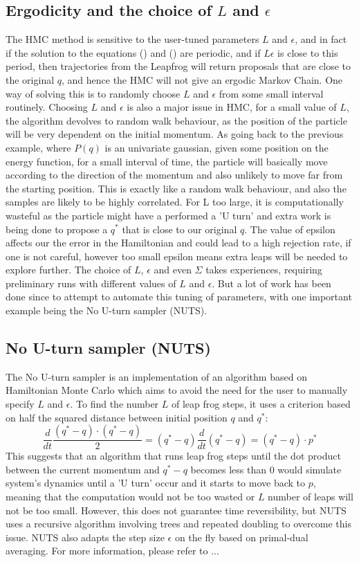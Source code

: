 \documentclass[11pt]{article}
\begin{document}
\subsection{Ergodicity and the choice of $L$ and $\epsilon$}
The HMC method is sensitive to the user-tuned parameters $L$ and $\epsilon$, and in fact if the solution to the equations () and () are periodic, and if $L\epsilon$ is close to this period, then trajectories from the Leapfrog will return proposals that are close to the original $q$, and hence the HMC will not give an ergodic Markov Chain. One way of solving this is to randomly choose $L$ and $\epsilon$ from some small interval routinely. Choosing $L$ and $\epsilon$ is also a major issue in HMC, for a small value of $L$, the algorithm devolves to random walk behaviour, as the position of the particle will be very dependent on the initial momentum. As going back to the previous example, where $P(q)$ is an univariate gaussian, given some position on the energy function, for a small interval of time, the particle will basically move according to the direction of the momentum and also unlikely to move far from the starting position. This is exactly like  a random walk behaviour, and also the samples are likely to be highly correlated. For L too large, it is computationally wasteful as the particle might have a performed a 'U turn' and extra work is being done to propose a $q^{*}$ that is close to our original $q$. The value of epsilon affects our the error in the Hamiltonian and could lead to a high rejection rate, if one is not careful, however too small epsilon means extra leaps will be needed to explore further.
The choice of $L$, $\epsilon$ and even $\Sigma$ takes experiences, requiring preliminary runs with different values of $L$ and $\epsilon$. But a lot of work has been done since to attempt to automate this tuning of parameters, with one important example being the No U-turn sampler (NUTS).
\subsection{No U-turn sampler (NUTS)}
The No U-turn sampler\cite{NUTS} is an implementation of an algorithm based on Hamiltonian Monte Carlo which aims to avoid the need for the user to manually specify $L$ and $\epsilon$. To find the number $L$ of leap frog steps, it uses a criterion based on half the squared distance between initial position $q$ and $q^{*}$:  
\begin{equation}
\frac{d}{dt}\frac{(q^{*}-q) \cdot(q^{*}-q) }{2}=(q^{*}-q)\frac{d}{dt}(q^{*}-q)=(q^{*}-q)\cdot p^{*}
\end{equation}
This suggests that an algorithm that runs leap frog steps until the dot product between the current momentum and $q^{*}-q$ becomes less than 0 would simulate system's dynamics until a 'U turn' occur and it starts to move back to $p$, meaning that the computation would not be too wasted or $L$ number of leaps will not be too small. However, this does not guarantee time reversibility, but NUTS uses a recursive algorithm involving trees and repeated doubling to overcome this issue. NUTS also adapts the step size $\epsilon$ on the fly based on primal-dual averaging. For more information, please refer to ...  
\end{document}
